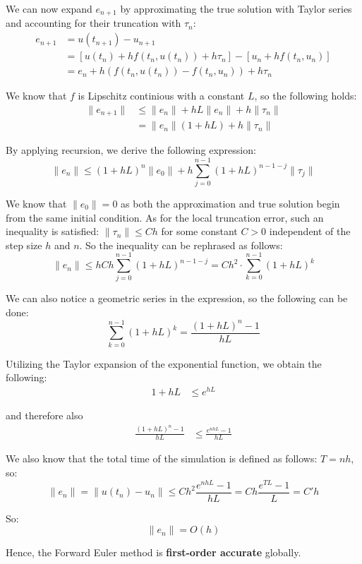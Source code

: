 \documentclass[11pt]{article}
\begin{document}
We can now expand $e_{n+1}$ by approximating the true solution with Taylor series and accounting for their truncation with $\tau_n$:
\begin{align*}
e_{n+1} &= u(t_{n+1}) - u_{n+1} \\
        &= [u(t_n) + h f(t_n, u(t_n)) + h \tau_n] - [u_n + h f(t_n, u_n)] \\
        &= e_n + h (f(t_n, u(t_n)) - f(t_n, u_n)) + h \tau_n
\end{align*}

We know that $f$ is Lipschitz continious with a constant $L$, so the following holds:
\begin{align*}
\|e_{n+1}\| &\le \|e_n\| + hL\|e_n\| + h\|\tau_n\| \\
            &= \|e_n\|(1+hL) +  h\|\tau_n\|
\end{align*}

By applying recursion, we derive the following expression:
\[
\|e_n\| \leq (1 + hL)^n \|e_0\| + h \sum_{j=0}^{n-1} (1 + hL)^{n-1-j} \|\tau_j\|
\]

We know that $\|e_0\| = 0$ as both the approximation and true solution begin from the same initial condition. As for the local truncation error, such an inequality is satisfied: $\|\tau_n\| \le Ch$ for some constant $C>0$ independent of the step size $h$ and $n$. So the inequality can be rephrased as follows:
\[
\|e_n\| \leq h C h \sum_{j=0}^{n-1} (1 + hL)^{n-1-j}
= C h^2 \cdot \sum_{k=0}^{n-1} (1 + hL)^k
\]

We can also notice a geometric series in the expression, so the following can be done:
\[
\sum_{k=0}^{n-1} (1 + hL)^k = \frac{(1 + hL)^n - 1}{hL} 
\]

Utilizing the Taylor expansion of the exponential function, we obtain the following:
\begin{align*}
    1+hL &\le e^{hL} 
\end{align*}

and therefore also
\begin{align*}
    \frac{(1+hL)^n -1}{hL} &\le \frac{e^{nhL} -1}{hL}
\end{align*}

We also know that the total time of the simulation is defined as follows: $T = nh$, so:
\[
\|e_n\|=\|u(t_n)-u_n\| \le Ch^2\frac{e^{nhL} -1}{hL} = Ch\frac{e^{TL} -1}{L} = C'h
\]

So:
\[
\|e_n\| = O(h)
\]

Hence, the Forward Euler method is \textbf{first-order accurate} globally.
\end{document}
